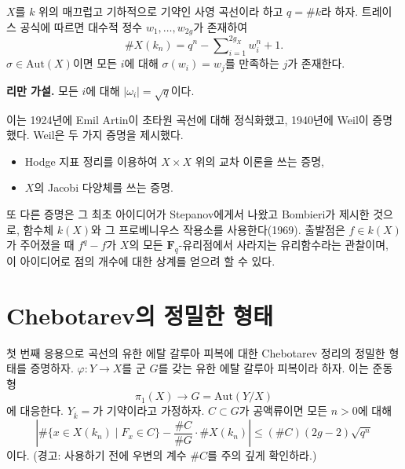 \noindent
$X$를 $k$ 위의 매끄럽고 기하적으로 기약인 사영 곡선이라 하고
$q = \# k$라 하자. 트레이스 공식에 따르면 대수적 정수
$w_1, \ldots, w_{2g}$가 존재하여
$$
\# X(k_n) = q^n - \sum\nolimits_{i = 1}^{2g_X} w_i^n + 1.
$$
$\sigma\in \text{Aut}(X)$이면 모든 $i$에 대해
$\sigma(w_i)=w_j$를 만족하는 $j$가 존재한다.

\medskip\noindent
{\bf 리만 가설.} 모든 $i$에 대해 $|\omega_i| = \sqrt{q}$이다.

\medskip\noindent
이는 1924년에 Emil Artin이 초타원 곡선에 대해 정식화했고,
1940년에 Weil이 증명했다. Weil은 두 가지 증명을 제시했다.
\begin{itemize}
\item Hodge 지표 정리를 이용하여 $X \times X$ 위의 교차 이론을 쓰는 증명,
\item $X$의 Jacobi 다양체를 쓰는 증명.
\end{itemize}
또 다른 증명은 그 최초 아이디어가 Stepanov에게서 나왔고 Bombieri가
제시한 것으로, 함수체 $k(X)$와 그 프로베니우스 작용소를 사용한다(1969).
출발점은 $f\in k(X)$가 주어졌을 때 $f^q - f$가 $X$의 모든
$\mathbf{F}_q$-유리점에서 사라지는 유리함수라는 관찰이며, 이 아이디어로
점의 개수에 대한 상계를 얻으려 할 수 있다.


\section{Chebotarev의 정밀한 형태}
\label{section-chebotarev}

\noindent
첫 번째 응용으로 곡선의 유한 에탈 갈루아 피복에 대한
Chebotarev 정리의 정밀한 형태를 증명하자.
$\varphi : Y \to X$를 군 $G$를 갖는 유한 에탈 갈루아 피복이라 하자.
이는 준동형
$$
\pi_1(X) \longrightarrow G = \text{Aut}(Y/X)
$$
에 대응한다.
$Y_{\overline{k}} = $가 기약이라고 가정하자.
$C\subset G$가 공액류이면 모든 $n > 0$에 대해
$$
| \# \{x \in X(k_n) \mid F_x \in C\} - \frac{\# C}{\# G} \cdot \# X(k_n) |
\leq
(\# C)(2g - 2) \sqrt{q^n}
$$
이다. (경고: 사용하기 전에 우변의 계수 $\# C$를 주의 깊게 확인하라.)

